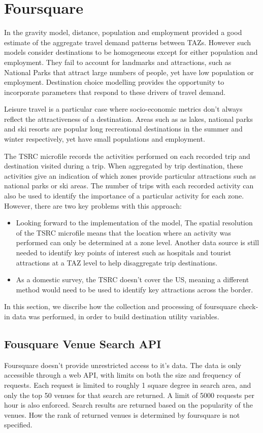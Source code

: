 \section{Foursquare}
In the gravity model, distance, population and employment provided a good estimate of the aggregate travel demand patterns between TAZs. However such models consider destinations to be homogeneous except for either population and employment. They fail to account for landmarks and attractions, such as National Parks that attract large numbers of people, yet have low population or employment. Destination choice modelling provides the opportunity to incorporate parameters that respond to these drivers of travel demand. 
	
Leisure travel is a particular case where socio-economic metrics don't always reflect the attractiveness of a destination. Areas such as as lakes, national parks and ski resorts are popular long recreational destinations in the summer and winter respectively, yet have small populations and employment. 
	
The TSRC microfile records the activities performed on each recorded trip and destination visited during a trip. When aggregated by trip destination, these activities give an indication of which zones provide particular attractions such as national parks or ski areas. The number of trips with each recorded activity can also be used to identify the importance of a particular activity for each zone. However, there are two key problems with this approach:

\begin{itemize}
\item Looking forward to the implementation of the model,  The spatial resolution of the TSRC microfile means that the location where an activity was performed can only be determined at a zone level. Another data source is still needed to identify key points of interest such as hospitals and tourist attractions at a TAZ level to help disaggregate trip destinations.
\item As a domestic survey, the TSRC doesn't cover the US, meaning a different method would need to be used to identify key attractions across the border.
\end{itemize}	
In this section, we discribe how the collection and processing of foursquare check-in data was performed, in order to build destination utility variables.

\subsection{Fousquare Venue Search API}
Foursquare doesn't provide unrestricted access to it's data. The data is only accessible through a web API, with limits on both the size and frequency of requests. Each request is limited to roughly 1 square degree in search area, and only the top 50 venues for that search are returned. A limit of 5000 requests per hour is also enforced. Search results are returned based on the popularity of the venues. How the rank of returned venues is determined by foursquare is not specified. 

